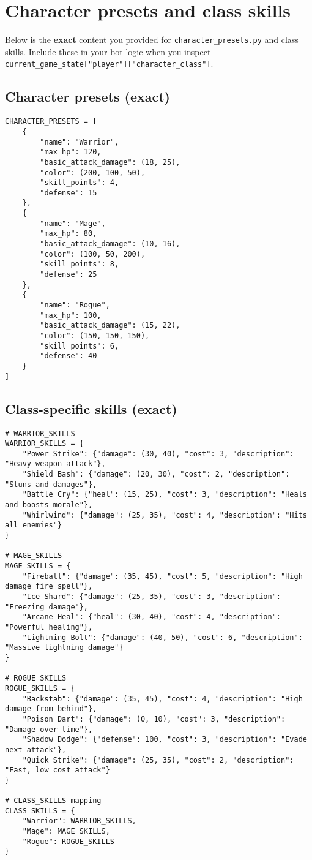 \documentclass[11pt]{article}
\begin{document}
\section{Character presets and class skills}
Below is the \textbf{exact} content you provided for \texttt{character\_presets.py} and class skills. Include these in your bot logic when you inspect \texttt{current\_game\_state["player"]["character\_class"]}.

\subsection{Character presets (exact)}
\begin{lstlisting}
CHARACTER_PRESETS = [
    {
        "name": "Warrior",
        "max_hp": 120,
        "basic_attack_damage": (18, 25),
        "color": (200, 100, 50),
        "skill_points": 4,
        "defense": 15
    },
    {
        "name": "Mage",
        "max_hp": 80,
        "basic_attack_damage": (10, 16),
        "color": (100, 50, 200),
        "skill_points": 8,
        "defense": 25
    },
    {
        "name": "Rogue",
        "max_hp": 100,
        "basic_attack_damage": (15, 22),
        "color": (150, 150, 150),
        "skill_points": 6,
        "defense": 40
    }
]
\end{lstlisting}

\subsection{Class-specific skills (exact)}
\begin{lstlisting}
# WARRIOR_SKILLS
WARRIOR_SKILLS = {
    "Power Strike": {"damage": (30, 40), "cost": 3, "description": "Heavy weapon attack"},
    "Shield Bash": {"damage": (20, 30), "cost": 2, "description": "Stuns and damages"},
    "Battle Cry": {"heal": (15, 25), "cost": 3, "description": "Heals and boosts morale"},
    "Whirlwind": {"damage": (25, 35), "cost": 4, "description": "Hits all enemies"}
}

# MAGE_SKILLS
MAGE_SKILLS = {
    "Fireball": {"damage": (35, 45), "cost": 5, "description": "High damage fire spell"},
    "Ice Shard": {"damage": (25, 35), "cost": 3, "description": "Freezing damage"},
    "Arcane Heal": {"heal": (30, 40), "cost": 4, "description": "Powerful healing"},
    "Lightning Bolt": {"damage": (40, 50), "cost": 6, "description": "Massive lightning damage"}
}

# ROGUE_SKILLS
ROGUE_SKILLS = {
    "Backstab": {"damage": (35, 45), "cost": 4, "description": "High damage from behind"},
    "Poison Dart": {"damage": (0, 10), "cost": 3, "description": "Damage over time"},
    "Shadow Dodge": {"defense": 100, "cost": 3, "description": "Evade next attack"},
    "Quick Strike": {"damage": (25, 35), "cost": 2, "description": "Fast, low cost attack"}
}

# CLASS_SKILLS mapping
CLASS_SKILLS = {
    "Warrior": WARRIOR_SKILLS,
    "Mage": MAGE_SKILLS,
    "Rogue": ROGUE_SKILLS
}
\end{lstlisting}
\end{document}
